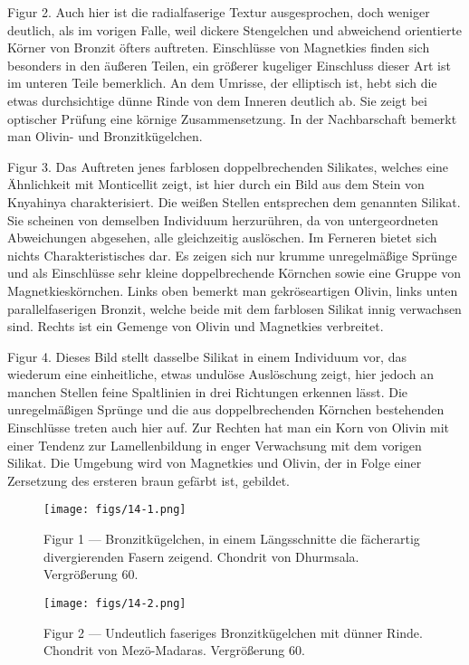 \documentclass[a4paper, 12pt, oneside]{article}
\begin{document}
Figur 2. Auch hier ist die radialfaserige Textur ausgesprochen, doch weniger deutlich, als im vorigen Falle, weil dickere Stengelchen und abweichend orientierte Körner von Bronzit öfters auftreten. Einschlüsse von Magnetkies finden sich besonders in den äußeren Teilen, ein größerer kugeliger Einschluss dieser Art ist im unteren Teile bemerklich. An dem Umrisse, der elliptisch ist, hebt sich die etwas durchsichtige dünne Rinde von dem Inneren deutlich ab. Sie zeigt bei optischer Prüfung eine körnige Zusammensetzung. In der Nachbarschaft bemerkt man Olivin- und Bronzitkügelchen.

Figur 3. Das Auftreten jenes farblosen doppelbrechenden Silikates, welches eine Ähnlichkeit mit Monticellit zeigt, ist hier durch ein Bild aus dem Stein von Knyahinya charakterisiert. Die weißen Stellen entsprechen dem genannten Silikat. Sie scheinen von demselben Individuum herzurühren, da von untergeordneten Abweichungen abgesehen, alle gleichzeitig auslöschen. Im Ferneren bietet sich nichts Charakteristisches dar. Es zeigen sich nur krumme unregelmäßige Sprünge und als Einschlüsse sehr kleine doppelbrechende Körnchen sowie eine Gruppe von Magnetkieskörnchen. Links oben bemerkt man gekröseartigen Olivin, links unten parallelfaserigen Bronzit, welche beide mit dem farblosen Silikat innig verwachsen sind. Rechts ist ein Gemenge von Olivin und Magnetkies verbreitet.

Figur 4. Dieses Bild stellt dasselbe Silikat in einem Individuum vor, das wiederum eine einheitliche, etwas undulöse Auslöschung zeigt, hier jedoch an manchen Stellen feine Spaltlinien in drei Richtungen erkennen lässt. Die unregelmäßigen Sprünge und die aus doppelbrechenden Körnchen bestehenden Einschlüsse treten auch hier auf. Zur Rechten hat man ein Korn von Olivin mit einer Tendenz zur Lamellenbildung in enger Verwachsung mit dem vorigen Silikat. Die Umgebung wird von Magnetkies und Olivin, der in Folge einer Zersetzung des ersteren braun gefärbt ist, gebildet.
\clearpage

\vspace*{\fill}
\begin{figure}[H]
\centering
\texttt{[image: figs/14-1.png]}
\caption{\small Figur 1 --- Bronzitkügelchen, in einem Längsschnitte die fächerartig divergierenden Fasern zeigend. Chondrit von Dhurmsala. Vergrößerung 60.}
\end{figure}
\vspace*{\fill}
\clearpage

\vspace*{\fill}
\begin{figure}[H]
\centering
\texttt{[image: figs/14-2.png]}
\caption{\small Figur 2 --- Undeutlich faseriges Bronzitkügelchen mit dünner Rinde. Chondrit von Mezö-Madaras. Vergrößerung 60.}
\end{figure}
\vspace*{\fill}
\clearpage
\end{document}

